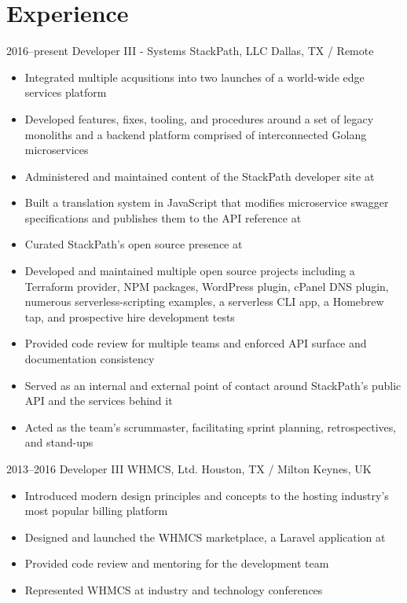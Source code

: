 \documentclass[11pt,a4paper,sans]{moderncv}
\begin{document}
    \section{Experience}
	\cventry
	    {2016--present}
	    {Developer III - Systems}
	    {StackPath, LLC}
	    {Dallas, TX / Remote}
	    {}
	    {
                \begin{itemize}
                    \item Integrated multiple acqusitions into two launches of a world-wide edge services platform
                    \item Developed features, fixes, tooling, and procedures around a set of legacy monoliths and a backend platform comprised of interconnected Golang microservices
		    \item Administered and maintained content of the StackPath developer site at 
		    \item Built a translation system in JavaScript that modifies microservice swagger specifications and publishes them to the API reference at 
                    \item Curated StackPath's open source presence at 
                    \item Developed and maintained multiple open source projects including a Terraform provider, NPM packages, WordPress plugin, cPanel DNS plugin, numerous serverless-scripting examples, a serverless CLI app, a Homebrew tap, and prospective hire development tests
                    \item Provided code review for multiple teams and enforced API surface and documentation consistency
                    \item Served as an internal and external point of contact around StackPath's public API and the services behind it
                    \item Acted as the team's scrummaster, facilitating sprint planning, retrospectives, and stand-ups
		\end{itemize}
            }

        \cventry
            {2013--2016}
            {Developer III}
            {WHMCS, Ltd.}
            {Houston, TX / Milton Keynes, UK}
            {}
            {
                \begin{itemize}
                    \item Introduced modern design principles and concepts to the hosting industry's most popular billing platform
		    \item Designed and launched the WHMCS marketplace, a Laravel application at 
                    \item Provided code review and mentoring for the development team
                    \item Represented WHMCS at industry and technology conferences
                \end{itemize}
            }
\end{document}

